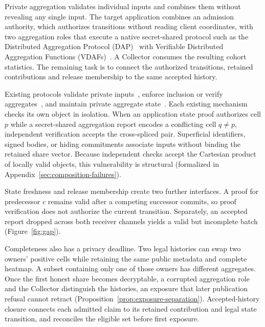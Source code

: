\documentclass[conference,compsoc]{IEEEtran}
\theoremstyle{definition}
\numberwithin{equation}{section}
\numberwithin{table}{section}
\numberwithin{figure}{section}
\theoremstyle{plain}
\begin{document}
Private aggregation validates individual inputs and combines them without
revealing any single input. The target application combines an admission
authority, which authorizes transitions without reading client coordinates,
with two aggregation roles that execute a native secret-shared protocol such as the
Distributed Aggregation Protocol (DAP)~\cite{Geoghegan2026DAP} with
Verifiable Distributed Aggregation Functions (VDAFs)~\cite{Barnes2023VDAF08,Corrigan2017Prio}. A Collector consumes the resulting
cohort statistics.
The remaining task is to connect the authorized transitions, retained
contributions and release membership to the same accepted history.

Existing protocols validate private inputs~\cite{Bell2023ACORN,Chowdhury2022EIFFeL,Rathee2023ELSA,Lycklama2023RoFL},
enforce inclusion or verify aggregates~\cite{Su2025SCIF,Acharya2025PEAR,Hahn2023VerSA},
and maintain private aggregate state~\cite{Ball2024Stateful}.
Each existing mechanism checks its own object in isolation.
When an application state proof authorizes cell \(p\) while a secret-shared aggregation report
encodes a conflicting cell \(q\ne p\), independent verification
accepts the cross-spliced pair. Superficial identifiers, signed bodies, or hiding commitments
associate inputs without binding the retained share vector. Because independent checks accept
the Cartesian product of locally valid objects, this vulnerability is structural (formalized in Appendix~\ref{sec:composition-failures}).

State freshness and release membership create two further interfaces. A proof
for predecessor \(c\) remains valid after a competing successor commits, so
proof verification does not authorize the current transition. Separately, an
accepted report dropped across both receiver channels yields a valid but incomplete
batch (Figure~\ref{fig:gap}).

Completeness also has a privacy deadline. Two legal histories can swap two
owners' positive cells while retaining the same public metadata and complete
heatmap. A subset containing only one of those owners has different aggregates.
Once the first honest share becomes decryptable, a corrupted aggregation role and
the Collector distinguish the histories, an exposure that later publication refusal
cannot retract (Proposition~\ref{prop:exposure-separation}). Accepted-history closure connects each admitted
claim to its retained contribution and legal state transition, and reconciles
the eligible set before first exposure.
\end{document}
